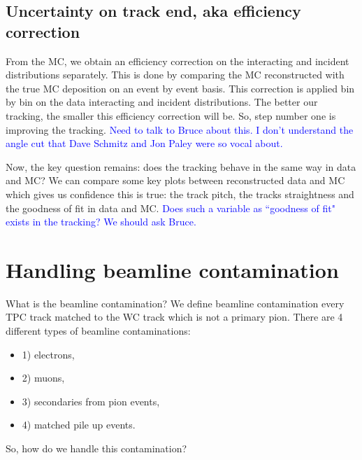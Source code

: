 \subsection{Uncertainty on track end, aka efficiency correction}
From the MC, we obtain an efficiency correction on the interacting and incident distributions separately. This is done by comparing the MC reconstructed with the true MC deposition on an event by event basis.
This correction is applied bin by bin on the data interacting and incident distributions.
The better our tracking, the smaller this efficiency correction will be. So, step number one is improving the tracking.
\textcolor{blue}{Need to talk to Bruce about this.}
\textcolor{blue}{ I don't understand the angle cut that Dave Schmitz and Jon Paley were so vocal about.}

Now, the key question remains: does the tracking behave in the same way in data and MC? 
We can compare some key plots between reconstructed data and MC which gives us confidence this is true: the track pitch, the tracks straightness and the goodness of fit in data and MC. \textcolor{blue}{ Does such a variable as ``goodness of fit" exists in the tracking? We should ask Bruce.}

\section{Handling beamline contamination}
What is the beamline contamination? We define beamline contamination every TPC track matched to the WC track which is not a primary pion. There are 4 different types of beamline contaminations:
\begin{itemize}
\item[]1) electrons,
\item[]2) muons,
\item[]3) secondaries from pion events,
\item[]4) matched pile up events.
\end{itemize}

So, how do we handle this contamination?

